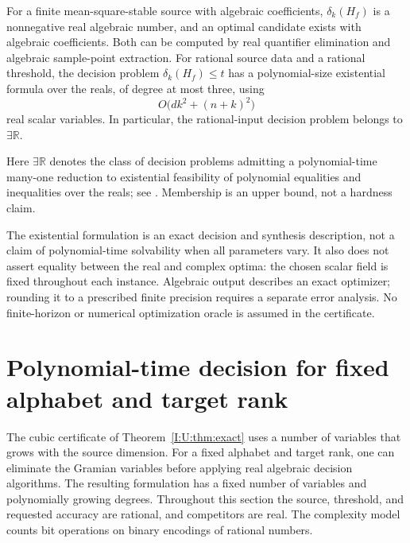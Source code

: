\begin{corollary}\label{I:U:cor:algebraic}\label{I:S:thm:etr}
For a finite mean-square-stable source with algebraic coefficients, $\delta_k(H_f)$ is a nonnegative real algebraic number, and an optimal candidate exists with algebraic coefficients. Both can be computed by real quantifier elimination and algebraic sample-point extraction.
For rational source data and a rational threshold, the decision problem $\delta_k(H_f)\le t$ has a polynomial-size existential formula over the reals, of degree at most three, using
\[
 O\bigl(dk^2+(n+k)^2\bigr)
\]
real scalar variables. In particular, the rational-input decision problem belongs to $\exists\mathbb R$.
\end{corollary}
Here $\exists\mathbb R$ denotes the class of decision problems admitting
a polynomial-time many-one reduction to existential feasibility of
polynomial equalities and inequalities over the reals; see
\citet{schaefer2024}. Membership is an upper bound, not a hardness claim.


\begin{remark}\label{I:U:rem:exact-scope}
The existential formulation is an exact decision and synthesis description, not a claim of polynomial-time solvability when all parameters vary. It also does not assert equality between the real and complex optima: the chosen scalar field is fixed throughout each instance. Algebraic output describes an exact optimizer; rounding it to a prescribed finite precision requires a separate error analysis. No finite-horizon or numerical optimization oracle is assumed in the certificate.
\end{remark}

\section{Polynomial-time decision for fixed alphabet and target rank}
\label{I:U:sec:complexity}

The cubic certificate of Theorem~\ref{I:U:thm:exact} uses a number of
variables that grows with the source dimension.  For a fixed alphabet and
target rank, one can eliminate the Gramian variables before applying real
algebraic decision algorithms.  The resulting formulation has a fixed number
of variables and polynomially growing degrees.  Throughout this section the
source, threshold, and requested accuracy are rational, and competitors are
real.  The complexity model counts bit operations on binary encodings of
rational numbers.

